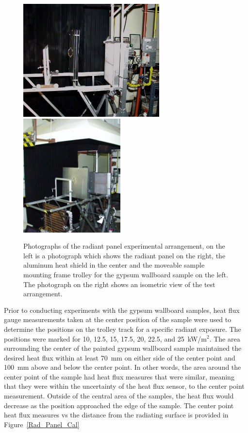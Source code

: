 \documentclass[twoside]{uocthesis}
\begin{document}
{\begin{figure}
	\centering
	\includegraphics[width=2.92in]{../Figures/RAD_pan}
	\includegraphics[width=2.08in]{../Figures/RAD_pan_iso} \\
	\caption[Photographs of the radiant panel experimental arrangement]{Photographs of the radiant panel experimental arrangement, on the left is a photograph which shows the radiant panel on the right, the aluminum heat shield in the center and the moveable sample mounting frame trolley for the gypsum wallboard sample on the left.  The photograph on the right shows an isometric view of the test arrangement.}
	\label{Rad_Panel}
\end{figure}

Prior to conducting experiments with the gypsum wallboard samples, heat flux gauge measurements taken at the center position of the sample were used to determine the positions on the trolley track for a specific radiant exposure. The positions were marked for 10, 12.5, 15, 17.5, 20, 22.5, and 25~kW/m$^2$. The area surrounding the center of the painted gypsum wallboard sample maintained the desired heat flux within at least 70~mm on either side of the center point and 100~mm above and below the center point.  In other words, the area around the center point of the sample had heat flux measures that were similar, meaning that they were within the uncertainty of the heat flux sensor, to the center point measurement. Outside of the central area of the samples, the heat flux would decrease as the position approached the edge of the sample.  The center point heat flux measures vs the distance from the radiating surface is provided in Figure~\ref{Rad_Panel_Cal}   

}
\end{document}
